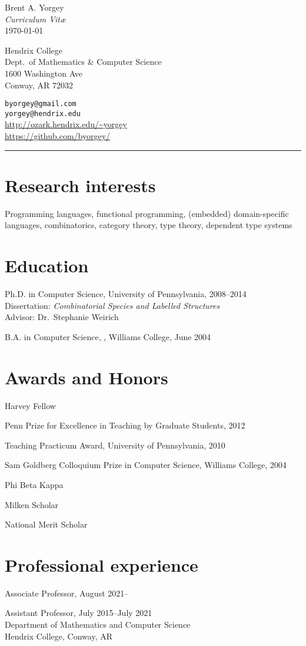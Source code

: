 \documentclass[12pt]{article}
\newcommand{\cvitem}{\par\hangpara{2em}{1}}
\begin{document}
\begin{center}
  {\huge Brent A. Yorgey} \\
  \emph{Curriculum Vit\ae} \\
  \today
\end{center}

\noindent
\parbox{3.5in}{
Hendrix College \\
Dept.\ of Mathematics \& Computer Science \\
1600 Washington Ave \\
Conway, AR 72032
}
\hfill
\parbox{3in}{
\texttt{byorgey@gmail.com} \\
\texttt{yorgey@hendrix.edu} \\
\url{http://ozark.hendrix.edu/~yorgey} \\
\url{https://github.com/byorgey/}
}
\medskip

\hrule


\section*{Research interests}
Programming languages, functional programming, (embedded)
domain-specific languages, combinatorics, category theory, type
theory, dependent type systems

\section*{Education}
\cvitem
Ph.D. in Computer Science, University of
Pennsylvania, 2008--2014 \\ Dissertation: \emph{Combinatorial
  Species and Labelled Structures} \\ Advisor: Dr.\ Stephanie Weirich

\cvitem B.A. in Computer Science, , Williams
College, June 2004

\section*{Awards and Honors}
\cvitem Harvey Fellow
\cvitem Penn Prize for Excellence in Teaching by Graduate Students, 2012
\cvitem Teaching Practicum Award, University of Pennsylvania, 2010
\cvitem Sam Goldberg Colloquium Prize in Computer Science, Williams
College, 2004
\cvitem Phi Beta Kappa
\cvitem Milken Scholar
\cvitem National Merit Scholar

\section*{Professional experience}
\cvitem
Associate Professor, August 2021--
\cvitem
Assistant Professor, July 2015--July 2021\\
Department of Mathematics and Computer Science \\
Hendrix College, Conway, AR
\end{document}
